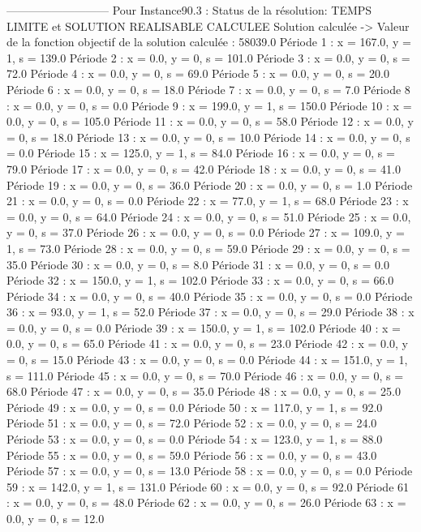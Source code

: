 ---------------------------
Pour Instance90.3  :
Status de la résolution: TEMPS LIMITE et SOLUTION REALISABLE CALCULEE
Solution calculée
-> Valeur de la fonction objectif de la solution calculée :  58039.0
Période 1 : x = 167.0, y = 1, s = 139.0
Période 2 : x = 0.0, y = 0, s = 101.0
Période 3 : x = 0.0, y = 0, s = 72.0
Période 4 : x = 0.0, y = 0, s = 69.0
Période 5 : x = 0.0, y = 0, s = 20.0
Période 6 : x = 0.0, y = 0, s = 18.0
Période 7 : x = 0.0, y = 0, s = 7.0
Période 8 : x = 0.0, y = 0, s = 0.0
Période 9 : x = 199.0, y = 1, s = 150.0
Période 10 : x = 0.0, y = 0, s = 105.0
Période 11 : x = 0.0, y = 0, s = 58.0
Période 12 : x = 0.0, y = 0, s = 18.0
Période 13 : x = 0.0, y = 0, s = 10.0
Période 14 : x = 0.0, y = 0, s = 0.0
Période 15 : x = 125.0, y = 1, s = 84.0
Période 16 : x = 0.0, y = 0, s = 79.0
Période 17 : x = 0.0, y = 0, s = 42.0
Période 18 : x = 0.0, y = 0, s = 41.0
Période 19 : x = 0.0, y = 0, s = 36.0
Période 20 : x = 0.0, y = 0, s = 1.0
Période 21 : x = 0.0, y = 0, s = 0.0
Période 22 : x = 77.0, y = 1, s = 68.0
Période 23 : x = 0.0, y = 0, s = 64.0
Période 24 : x = 0.0, y = 0, s = 51.0
Période 25 : x = 0.0, y = 0, s = 37.0
Période 26 : x = 0.0, y = 0, s = 0.0
Période 27 : x = 109.0, y = 1, s = 73.0
Période 28 : x = 0.0, y = 0, s = 59.0
Période 29 : x = 0.0, y = 0, s = 35.0
Période 30 : x = 0.0, y = 0, s = 8.0
Période 31 : x = 0.0, y = 0, s = 0.0
Période 32 : x = 150.0, y = 1, s = 102.0
Période 33 : x = 0.0, y = 0, s = 66.0
Période 34 : x = 0.0, y = 0, s = 40.0
Période 35 : x = 0.0, y = 0, s = 0.0
Période 36 : x = 93.0, y = 1, s = 52.0
Période 37 : x = 0.0, y = 0, s = 29.0
Période 38 : x = 0.0, y = 0, s = 0.0
Période 39 : x = 150.0, y = 1, s = 102.0
Période 40 : x = 0.0, y = 0, s = 65.0
Période 41 : x = 0.0, y = 0, s = 23.0
Période 42 : x = 0.0, y = 0, s = 15.0
Période 43 : x = 0.0, y = 0, s = 0.0
Période 44 : x = 151.0, y = 1, s = 111.0
Période 45 : x = 0.0, y = 0, s = 70.0
Période 46 : x = 0.0, y = 0, s = 68.0
Période 47 : x = 0.0, y = 0, s = 35.0
Période 48 : x = 0.0, y = 0, s = 25.0
Période 49 : x = 0.0, y = 0, s = 0.0
Période 50 : x = 117.0, y = 1, s = 92.0
Période 51 : x = 0.0, y = 0, s = 72.0
Période 52 : x = 0.0, y = 0, s = 24.0
Période 53 : x = 0.0, y = 0, s = 0.0
Période 54 : x = 123.0, y = 1, s = 88.0
Période 55 : x = 0.0, y = 0, s = 59.0
Période 56 : x = 0.0, y = 0, s = 43.0
Période 57 : x = 0.0, y = 0, s = 13.0
Période 58 : x = 0.0, y = 0, s = 0.0
Période 59 : x = 142.0, y = 1, s = 131.0
Période 60 : x = 0.0, y = 0, s = 92.0
Période 61 : x = 0.0, y = 0, s = 48.0
Période 62 : x = 0.0, y = 0, s = 26.0
Période 63 : x = 0.0, y = 0, s = 12.0
